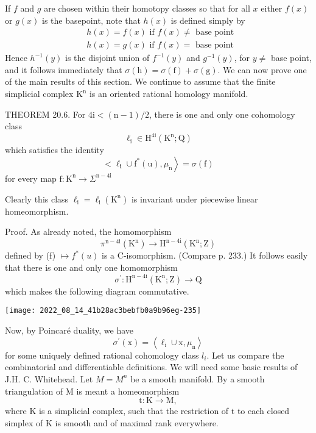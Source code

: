 \documentclass[10pt]{article}
\begin{document}
If $f$ and $g$ are chosen within their homotopy classes so that for all $x$ either $f(x)$ or $g(x)$ is the basepoint, note that $h(x)$ is defined simply by
$$
\begin{aligned}
&h(x)=f(x) \text { if } f(x) \neq \text { base point } \\
&h(x)=g(x) \text { if } f(x)=\text { base point }
\end{aligned}
$$
Hence $h^{-1}(y)$ is the disjoint union of $f^{-1}(y)$ and $g^{-1}(y)$, for $y \neq$ base point, and it follows immediately that $\sigma(\mathrm{h})=\sigma(\mathrm{f})+\sigma(\mathrm{g})$. We can now prove one of the main results of this section. We continue to assume that the finite simplicial complex $\mathrm{K}^{\mathrm{n}}$ is an oriented rational homology manifold.

THEOREM 20.6. For $4 \mathrm{i}<(\mathrm{n}-1) / 2$, there is one and only one cohomology class
$$
\ell_{\mathrm{i}} \in \mathrm{H}^{4 \mathrm{i}}\left(\mathrm{K}^{\mathrm{n}} ; \mathrm{Q}\right)
$$
which satisfies the identity
$$
\left.<\ell_{\mathbf{i}} \cup \mathrm{f}^{*}(\mathrm{u}), \mu_{\mathrm{n}}\right\rangle=\sigma(\mathrm{f})
$$
for every map $\mathrm{f}: \mathrm{K}^{\mathrm{n}} \rightarrow \Sigma^{\mathrm{n}-4 \mathrm{i}}$

Clearly this class $\ell_{\mathrm{i}}=\ell_{\mathrm{i}}\left(\mathrm{K}^{\mathrm{n}}\right)$ is invariant under piecewise linear homeomorphism.

Proof. As already noted, the homomorphism
$$
\pi^{\mathrm{n}-4 \mathrm{i}}\left(\mathrm{K}^{\mathrm{n}}\right) \rightarrow \mathrm{H}^{\mathrm{n}-4 \mathrm{i}}\left(\mathrm{K}^{\mathrm{n}} ; \mathrm{Z}\right)
$$
defined by (f) $\mapsto f^{*}(u)$ is a C-isomorphism. (Compare p. 233.) It follows easily that there is one and only one homomorphism
$$
\sigma^{\prime}: \mathrm{H}^{\mathrm{n}-4 \mathrm{i}}\left(\mathrm{K}^{\mathrm{n}} ; \mathrm{Z}\right) \rightarrow \mathrm{Q}
$$
which makes the following diagram commutative.

\texttt{[image: 2022\_08\_14\_41b28ac3bebfb0a9b96eg-235]}

Now, by Poincaré duality, we have
$$
\sigma^{\prime}(\mathrm{x})=\left\langle\ell_{\mathrm{i}} \cup \mathrm{x}, \mu_{\mathrm{n}}\right\rangle
$$
for some uniquely defined rational cohomology class $l_{i}$. Let us compare the combinatorial and differentiable definitions. We will need some basic results of J.H. C. Whitehead. Let $M=M^{n}$ be a smooth manifold. By a smooth triangulation of $\mathrm{M}$ is meant a homeomorphism
$$
\mathrm{t}: \mathrm{K} \rightarrow \mathrm{M},
$$
where $\mathrm{K}$ is a simplicial complex, such that the restriction of $\mathrm{t}$ to each closed simplex of $\mathrm{K}$ is smooth and of maximal rank everywhere.
\end{document}
